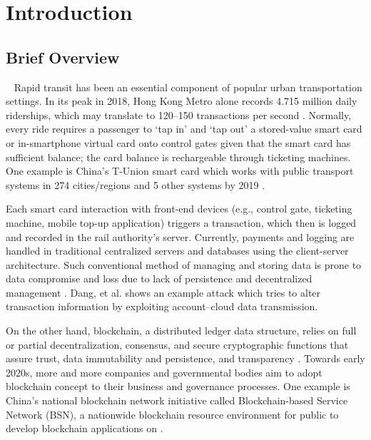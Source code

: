 \documentclass[a4paper,12pt,oneside, utf8x]{report}
\begin{document}
\chapter{Introduction}
\label{cintro}
\section{Brief Overview}\
\label{sbriefov}
   Rapid transit has been an essential component of popular urban transportation settings. In its peak in 2018, Hong Kong Metro alone records 4.715 million daily riderships, which may translate to 120--150 transactions per second \cite{hk1}. Normally, every ride requires a passenger to ‘tap in’ and ‘tap out’ a stored-value smart card or in-smartphone virtual card onto control gates given that the smart card has sufficient balance; the card balance is rechargeable through ticketing machines. One example is China’s T-Union smart card which works with public transport systems in 274 cities/regions and 5 other systems by 2019 \cite{a2}.
   
Each smart card interaction with front-end devices (e.g., control gate, ticketing machine, mobile top-up application) triggers a transaction, which then is logged and recorded in the rail authority’s server. Currently, payments and logging are handled in traditional centralized servers and databases \cite{a3,a4} using the client-server architecture. Such conventional method of managing and storing data is prone to data compromise and loss due to lack of persistence and decentralized management \cite{a5}. Dang, et al. \cite{a6} shows an example attack which tries to alter transaction information by exploiting account–cloud data transmission.

On the other hand, blockchain, a distributed ledger data structure, relies on full or partial decentralization, consensus, and secure cryptographic functions that assure trust, data immutability and persistence, and transparency \cite{a7}. Towards early 2020s, more and more companies and governmental bodies aim to adopt blockchain concept to their business and governance processes. One example is China’s national blockchain network initiative called Blockchain-based Service Network (BSN), a nationwide blockchain resource environment for public to develop blockchain applications on \cite{a8}.


\end{document}
